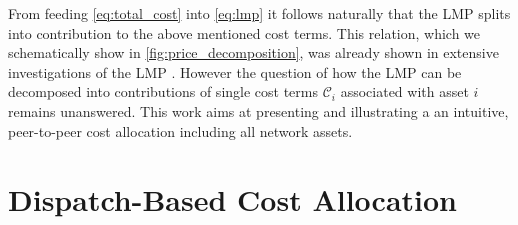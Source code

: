 \documentclass[11pt,twocolumn]{article}
\newcommand{\cost}{\mathcal{C}}
\begin{document}
From feeding \cref{eq:total_cost} into \cref{eq:lmp} it follows naturally that the LMP splits into contribution to the above mentioned cost terms. This relation, which we schematically show in \cref{fig:price_decomposition}, was already shown in extensive investigations of the LMP \cite{schweppe_spot_1988}. However the question of how the LMP can be decomposed into contributions of single cost terms $\cost_{i}$ associated with asset $i$ remains unanswered. This work aims at presenting and illustrating a an intuitive, peer-to-peer cost allocation including all network assets. 



\section{Dispatch-Based Cost Allocation}
\label{sec:theory}
\end{document}
